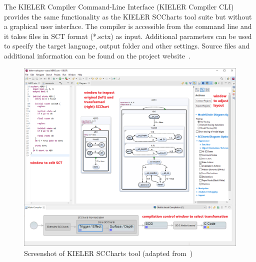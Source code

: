 The KIELER Compiler Command-Line Interface (KIELER Compiler CLI) provides the same functionality as the KIELER SCCharts tool suite but without a graphical user interface. The compiler is accessible from the command line and it takes files in SCT format (*.sctx) as input. Additional parameters can be used to specify the target language, output folder and other settings. Source files and additional information can be found on the project website~\cite{.11.09.2023}.
\begin{figure}[h!]
\centering
\includegraphics[width=1.0\textwidth]{bilder/KIELER_Tool_Screenshot.png}
\caption{Screenshot of KIELER SCCharts tool (adapted from~\cite{Motika.2017})}
\label{fig:KIELER_Tool_Screenshot}
\end{figure} 